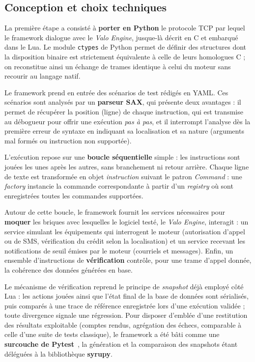 \subsection{Conception et choix techniques}

La première étape a consisté à \textbf{porter en Python} le protocole TCP par
lequel le framework dialogue avec le \emph{Valo Engine}, jusque-là décrit en C
et embarqué dans le Lua. Le module \texttt{ctypes} de Python permet de définir
des structures dont la disposition binaire est strictement équivalente à celle
de leurs homologues C ; on reconstitue ainsi un échange de trames identique à
celui du moteur sans recourir au langage natif.

Le framework prend en entrée des scénarios de test rédigés en YAML. Ces
scénarios sont analysés par un \textbf{parseur SAX}, qui présente deux
avantages : il permet de récupérer la position (ligne) de chaque instruction,
qui est transmise au débogueur pour offrir une exécution \emph{pas à
pas}, et il interrompt l'analyse dès la première erreur de syntaxe en
indiquant sa localisation et sa nature (arguments mal formés ou instruction
non supportée).

L'exécution repose sur une \textbf{boucle séquentielle} simple : les
instructions sont jouées les unes après les autres, sans branchement ni
retour arrière. Chaque ligne de texte est transformée en objet
\emph{instruction} suivant le patron \emph{Command} : une \emph{factory}
instancie la commande correspondante à partir d'un \emph{registry} où sont
enregistrées toutes les commandes supportées.

Autour de cette boucle, le framework fournit les services nécessaires pour
\textbf{moquer} les briques avec lesquelles le logiciel testé, le
\emph{Valo Engine}, interagit : un service simulant les équipements qui
interrogent le moteur (autorisation d'appel ou de SMS, vérification du crédit
selon la localisation) et un service recevant les notifications de seuil
émises par le moteur (courriels et messages). Enfin, un ensemble
d'instructions de \textbf{vérification} contrôle, pour une trame d'appel
donnée, la cohérence des données générées en base.

Le mécanisme de vérification reprend le principe de \emph{snapshot} déjà employé
côté Lua : les actions jouées ainsi que l'état final de la base de données sont
sérialisés, puis comparés à une trace de référence enregistrée lors d'une
exécution validée ; toute divergence signale une régression. Pour disposer
d'emblée d'une restitution des résultats exploitable (comptes rendus,
agrégation des échecs, comparable à celle d'une suite de tests classique), le
framework a été bâti comme une \textbf{surcouche de Pytest}~\cite{pytest-doc}, la génération et la
comparaison des snapshots étant déléguées à la bibliothèque \textbf{syrupy}.


